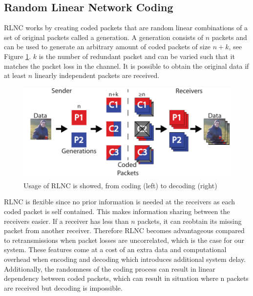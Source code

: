 \subsection{Random Linear Network Coding}

RLNC works by creating coded packets that are random linear combinations of a set of original packets called a generation. A generation consists of $n$ packets and can be used to generate an arbitrary amount of coded packets of size $n+k$, see Figure \ref{fig:NCIll}. $k$ is the number of redundant packet and can be varied such that it matches the packet loss in the channel. It is possible to obtain the original data if at least $n$ linearly independent packets are received.
\begin{figure}[ht]
	\centering
	\includegraphics[width=\linewidth]{images/NetworkCoding.pdf}
	\caption{Usage of RLNC is showed, from coding (left) to decoding (right)}
	\label{fig:NCIll}
\end{figure}

RLNC is flexible since no prior information is needed at the receivers as each coded packet is self contained. This makes information sharing between the receivers easier. If a receiver has less than $n$ packets, it can reobtain its missing packet from another receiver. Therefore RLNC becomes advantageous compared to retransmissions when packet losses are uncorrelated, which is the case for our system\cite{WorksheetGrid,anime}.
These features come at a cost of an extra data and computational overhead when encoding and decoding which introduces additional system delay. Additionally, the randomness of the coding process can result in linear dependency between coded packets, which can result in situation where n packets are received but decoding is impossible.

